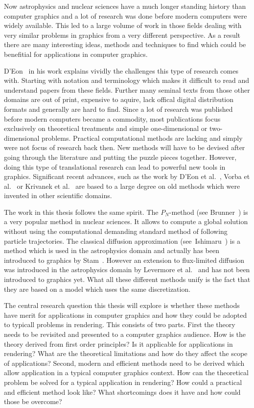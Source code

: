 Now astrophysics and nuclear sciences have a much longer standing history than computer graphics and a lot of research was done before modern computers were widely available. This led to a large volume of work in those fields dealing with very similar problems in graphics from a very different perspective. As a result there are many interesting ideas, methods and techniques to find which could be benefitial for applications in computer graphics.

D'Eon~\cite{DEon14} in his work explains vividly the challenges this type of research comes with. Starting with notation and terminology which makes it difficult to read and understand papers from these fields. Further many seminal texts from those other domains are out of print, expensive to aquire, lack offical digital distribution formats and generally are hard to find. Since a lot of research was published before modern computers became a commodity, most publications focus exclusively on theoretical treatments and simple one-dimensional or two-dimensional problems. Practical computational methods are lacking and simply were not focus of research back then. New methods will have to be devised after going through the literature and putting the puzzle pieces together. However, doing this type of translational research can lead to powerful new tools in graphics. Significant recent advances, such as the work by D'Eon et al.~\cite{dEon11}, Vorba et al.~\cite{Vorba16} or Krivanek et al.~\cite{Krivanek14} are based to a large degree on old methods which were invented in other scientific domains.

The work in this thesis follows the same spirit. The $P_N$-method (see Brunner~\cite{Brunner02}) is a very popular method in nuclear sciences. It allows to compute a global solution without using the computational demanding standard method of following particle trajectories. The classical diffusion approximation (see~Ishimaru~\cite{Ishimaru78}) is a method which is used in the astrophysics domain and actually has been introduced to graphics by Stam~\cite{Stam95}. However an extension to flux-limited diffusion was introduced in the astrophysics domain by Levermore et al.~\cite{Levermore81} and has not been introduced to graphics yet. What all these different methods unify is the fact that they are based on a model which uses the same discretization.

The central research question this thesis will explore is whether these methods have merit for applications in computer graphics and how they could be adopted to typicall problems in rendering. This consists of two parts. First the theory needs to be revisited and presented to a computer graphics audience. How is the theory derived from first order principles? Is it applicable for applications in rendering? What are the theoretical limitations and how do they affect the scope of applications? Second, modern and efficient methods need to be derived which allow application in a typical computer graphics context. How can the theoretical problem be solved for a typical application in rendering? How could a practical and efficient method look like? What shortcomings does it have and how could those be overcome?

